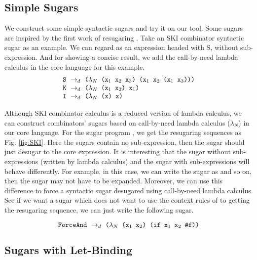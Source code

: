 \subsection{Simple Sugars}
\label{mark:simple}

We construct some simple syntactic sugars and try it on our tool. Some sugars are inspired by the first work of resugaring \cite{resugaring}.
Take an SKI combinator syntactic sugar as an example. We can regard  as an expression headed with S, without sub-expression. And for showing a concise result, we add the call-by-need lambda calculus in the core language for this example.
\[
\begin{array}{l}
\mbox{\tt S} ~\rightarrow_d~ \texttt{($\lambda_N$ ($\mbox{\tt x}_1$ $\mbox{\tt x}_2$ $\mbox{\tt x}_3$) ($\mbox{\tt x}_1$ $\mbox{\tt x}_2$ ($\mbox{\tt x}_1$ $\mbox{\tt x}_3$)))}\\
\mbox{\tt K} ~\rightarrow_d~ \texttt{($\lambda_N$ ($\mbox{\tt x}_1$ $\mbox{\tt x}_2$) $\mbox{\tt x}_1$)}\\
\mbox{\tt I} ~\rightarrow_d~ \texttt{($\lambda_N$ (x) x)}
\end{array}
\]




Although SKI combinator calculus is a reduced version of lambda calculus, we can construct combinators' sugars based on call-by-need lambda calculus ($\lambda_N$) in our core language. For the sugar program , we get the resugaring sequences as Fig.  \ref{fig:SKI}. Here the sugars contain no sub-expression, then the sugar should just desugar to the core expression. It is interesting that the sugar without sub-expressions (written by lambda calculus) and the sugar with sub-expressions will behave differently. For example, in this case, we can write the sugar as  and so on, then the sugar may not have to be expanded. Moreover, we can use this difference to force a syntactic sugar desugared using call-by-need lambda calculus. See if we want a sugar  which does not
want to use the context rules of  to getting the resugaring sequence, we can just write the following sugar.

\[
\texttt{ForceAnd} ~\rightarrow_d~ \texttt{($\lambda_N$ ($\mbox{\tt x}_1$ $\mbox{\tt x}_2$) (if $\mbox{\tt x}_1$ $\mbox{\tt x}_2$ \#f))}
\]






\subsection{Sugars with Let-Binding}
\label{mark:hygienic}


